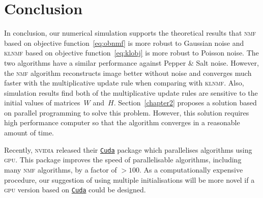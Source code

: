 \section{Conclusion}
In conclusion, our numerical simulation supports the theoretical results that \textsc{nmf} based on objective function~\eqref{eq:obnmf} is more robust to Gaussian noise and \textsc{klnmf} based on objective function~\eqref{eq:klobj} is more robust to Poisson noise. The two algorithms have a similar performance against Pepper \& Salt noise. However, the \textsc{nmf} algorithm reconstructs image better without noise and converges much faster with the multiplicative update rule when comparing with \textsc{klnmf}. Also, simulation results find both of the multiplicative update rules are sensitive to the initial values of matrices~$W$ and~$H$. Section~\ref{chapter2} proposes a solution based on parallel programming to solve this problem. However, this solution requires high performance computer so that the algorithm converges in a reasonable amount of time.

Recently, \textsc{nvidia} released their \href{https://developer.nvidia.com/cuda-zone}{\texttt{Cuda}} package which parallelises algorithms using \textsc{gpu}. This package improves the speed of parallelisable algorithms, including many \textsc{nmf} algorithms, by a factor of $>100$. As a computationally expensive procedure, our suggestion of using multiple initialisations will be more novel if a \textsc{gpu} version based on \href{https://developer.nvidia.com/cuda-zone}{\texttt{Cuda}} could be designed. 